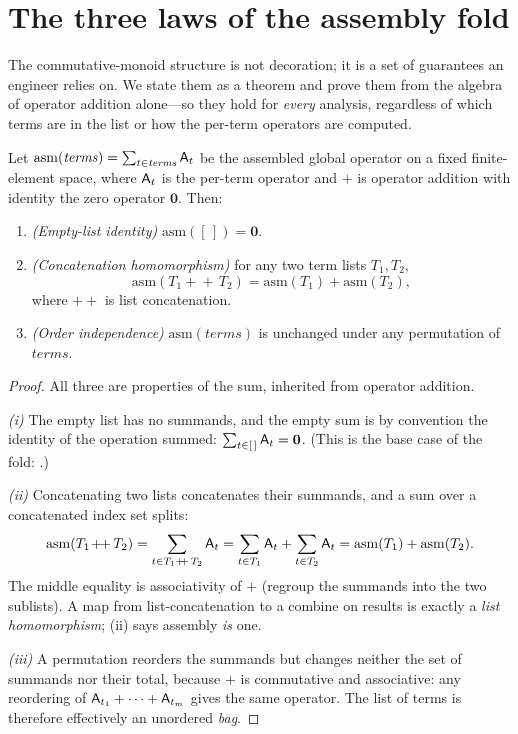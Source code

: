 \section{The three laws of the assembly fold}
\label{sec:laws}

The commutative-monoid structure is not decoration; it is a set of guarantees an
engineer relies on. We state them as a theorem and prove them from the algebra of
operator addition alone---so they hold for \emph{every} analysis, regardless of
which terms are in the list or how the per-term operators are computed.

\begin{theorem}
\label{thm:foldlaws}
Let $\mathrm{asm}(\mathit{terms})=\sum_{t\in\mathit{terms}}\mathsf{A}_t$ be the
assembled global operator on a fixed finite-element space, where $\mathsf{A}_t$ is
the per-term operator and $+$ is operator addition with identity the zero operator
$\mathbf 0$. Then:
\begin{enumerate}[label=\textup{(\roman*)},nosep]
\item \emph{(Empty-list identity)} $\mathrm{asm}([\,])=\mathbf 0$.
\item \emph{(Concatenation homomorphism)} for any two term lists $T_1,T_2$,
\[
\mathrm{asm}(T_1\!+\!\!+\,T_2)=\mathrm{asm}(T_1)+\mathrm{asm}(T_2),
\]
where $+\!\!+$ is list concatenation.
\item \emph{(Order independence)} $\mathrm{asm}(\mathit{terms})$ is unchanged
under any permutation of $\mathit{terms}$.
\end{enumerate}
\end{theorem}

\begin{proof}
All three are properties of the sum, inherited from operator addition.

\emph{(i)} The empty list has no summands, and the empty sum is by convention the
identity of the operation summed: $\sum_{t\in[\,]}\mathsf{A}_t=\mathbf 0$. (This is
the base case of the fold: .)

\emph{(ii)} Concatenating two lists concatenates their summands, and a sum over a
concatenated index set splits:
\[
\mathrm{asm}(T_1\!+\!\!+\,T_2)
=\sum_{t\in T_1+\!\!+\,T_2}\mathsf{A}_t
=\sum_{t\in T_1}\mathsf{A}_t+\sum_{t\in T_2}\mathsf{A}_t
=\mathrm{asm}(T_1)+\mathrm{asm}(T_2).
\]
The middle equality is associativity of $+$ (regroup the summands into the two
sublists). A map from list-concatenation to a combine on results is exactly a
\emph{list homomorphism}; (ii) says assembly \emph{is} one.

\emph{(iii)} A permutation reorders the summands but changes neither the set of
summands nor their total, because $+$ is commutative and associative: any
reordering of $\mathsf{A}_{t_1}+\cdots+\mathsf{A}_{t_m}$ gives the same operator. The
list of terms is therefore effectively an unordered \emph{bag}.
\end{proof}


